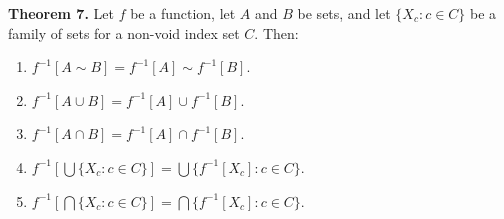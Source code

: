 \textbf{Theorem 7.} Let $f$ be a function, let $A$ and $B$ be sets, and let $\{X_c : c \in C\}$ be a family of sets for a non-void index set $C$. Then:
\begin{enumerate}
\item[(a)] $f^{-1}[A \sim B] = f^{-1}[A] \sim f^{-1}[B]$.
\item[(b)] $f^{-1}[A \cup B] = f^{-1}[A] \cup f^{-1}[B]$.
\item[(c)] $f^{-1}[A \cap B] = f^{-1}[A] \cap f^{-1}[B]$.
\item[(d)] $f^{-1}\left[\bigcup\{X_c : c \in C\}\right] = \bigcup\{f^{-1}[X_c] : c \in C\}$.
\item[(e)] $f^{-1}\left[\bigcap\{X_c : c \in C\}\right] = \bigcap\{f^{-1}[X_c] : c \in C\}$.
\end{enumerate}
